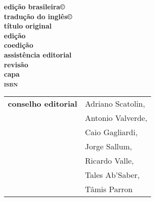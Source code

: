 \newcommand{\linha}[2]{\ifdef{#2}{\linhalayout{#1}{#2}}{}}

\begingroup\tiny
\parindent=0cm
\thispagestyle{empty}

\textbf{edição brasileira©}\\
\textbf{tradução do inglês©}\\

\textbf{título original}\\

\textbf{edição}\\
\textbf{coedição}\\
\textbf{assistência editorial}\\
\textbf{revisão}\\
\textbf{capa}\\

\textbf{\textsc{isbn}}

\hspace{-5pt}\begin{tabular}{ll}
\textbf{conselho editorial} & Adriano Scatolin,  \\
							& Antonio Valverde,  \\
							& Caio Gagliardi,    \\
							& Jorge Sallum,      \\
							& Ricardo Valle,     \\
							& Tales Ab'Saber,    \\
							& Tâmis Parron      
\end{tabular}
 
